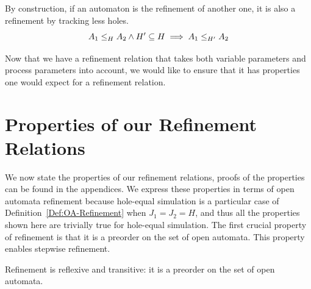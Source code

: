 \documentclass[runningheads]{llncs}
\newcommand{\xrightarrowdbl}[2][]{%
  \xrightarrow[#1]{#2}\mathrel{\mkern-14mu}\rightarrow
}
\begin{document}
%
%

\begin{lemma} By construction, if an automaton is the refinement of another one, it is also a refinement by tracking less holes.
\[\wrel{A_1}{A_2}{H} \land H'\subseteq H \implies \wrel{A_1}{A_2}{H'}\]
\end{lemma}

Now that we have a refinement relation that takes both variable parameters and process parameters into account, we would like to ensure that it has  properties one would expect for a refinement relation.

\section{Properties of our Refinement Relations}\label{sec:prop}

We now  state the properties of our refinement relations, proofs of the properties can be found in the appendices. We express these properties in terms of open automata refinement because hole-equal simulation is a particular case of Definition~\ref{Def:OA-Refinement} when  $J_1=J_2=H$, and thus all the properties shown here are trivially true for hole-equal simulation.
The first crucial property of  refinement  is that it is  a  preorder on the set of open automata. This property enables stepwise refinement.


\begin{theorem}
Refinement   is reflexive  and  transitive:  it  is  a  preorder on the set of open automata.
\end{theorem}
\end{document}
